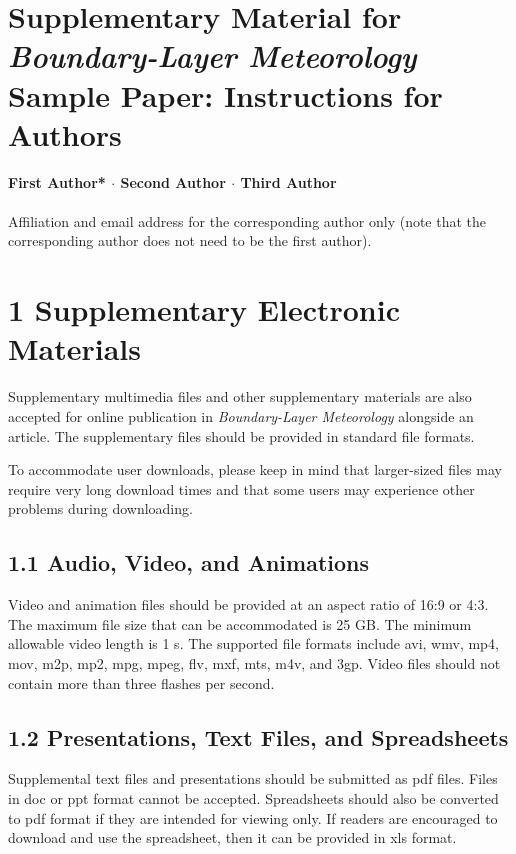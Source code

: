 


\newpage

\section*{Supplementary Material for \textit{Boundary-Layer Meteorology} Sample Paper: Instructions for Authors}

{\textbf{First Author* $\cdot$ Second Author $\cdot$ Third Author \\}}
\\
\text{*}Affiliation and email address for the corresponding author only (note that the corresponding author does not need to be the first author).

\section*{1 Supplementary Electronic Materials}
Supplementary multimedia files and other supplementary materials are also accepted for online publication in \textit{Boundary-Layer Meteorology }alongside an article. The supplementary files should be provided in standard file formats.

To accommodate user downloads, please keep in mind that larger-sized files may require very long download times and that some users may experience other problems during downloading.

\subsection*{1.1 Audio, Video, and Animations}
Video and animation files should be provided at an aspect ratio of 16:9 or 4:3. The maximum file size that can be accommodated is 25 GB. The minimum allowable video length is 1 s. The supported file formats include avi, wmv, mp4, mov, m2p, mp2, mpg, mpeg, flv, mxf, mts, m4v, and 3gp. Video files should not contain more than three flashes per second.

\subsection*{1.2 Presentations, Text Files, and Spreadsheets}
Supplemental text files and presentations should be submitted as pdf files. Files in doc or ppt format cannot be accepted. Spreadsheets should also be converted to pdf format if they are intended for viewing only. If readers are encouraged to download and use the spreadsheet, then it can be provided in xls format.

